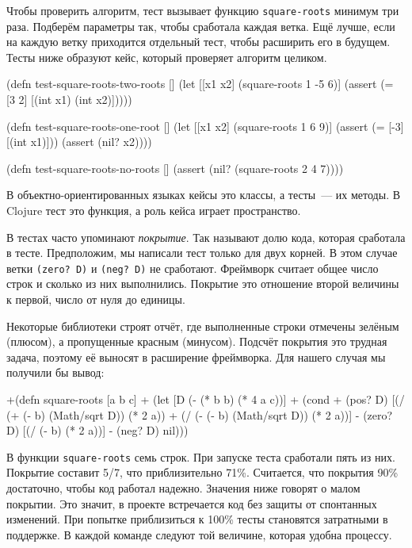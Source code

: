 
Чтобы проверить алгоритм, тест вызывает функцию \verb|square-roots| минимум три
раза. Подберём параметры так, чтобы сработала каждая ветка. Ещё лучше, если на
каждую ветку приходится отдельный тест, чтобы расширить его в будущем. Тесты ниже
образуют кейс, который проверяет алгоритм целиком.

\begin{english}
  \begin{clojure}
(defn test-square-roots-two-roots []
  (let [[x1 x2] (square-roots 1 -5 6)]
    (assert (= [3 2] [(int x1) (int x2)]))))

(defn test-square-roots-one-root []
  (let [[x1 x2] (square-roots 1 6 9)]
    (assert (= [-3] [(int x1)]))
    (assert (nil? x2))))

(defn test-square-roots-no-roots []
  (assert (nil? (square-roots 2 4 7))))
  \end{clojure}
\end{english}

В объектно-ориентированных языках кейсы это классы, а тесты~--- их методы. В
Clojure тест это функция, а роль кейса играет пространство.


В тестах часто упоминают \emph{покрытие}. Так называют долю кода, которая
сработала в тесте. Предположим, мы написали тест только для двух корней. В этом
случае ветки \verb|(zero? D)| и \verb|(neg? D)| не сработают. Фреймворк считает
общее число строк и сколько из них выполнились. Покрытие это отношение второй
величины к первой, число от нуля до единицы.

Некоторые библиотеки строят отчёт, где выполненные строки отмечены зелёным
(плюсом), а пропущенные красным (минусом). Подсчёт покрытия это трудная задача,
поэтому её выносят в расширение фреймворка. Для нашего случая мы получили бы
вывод:

\begin{english}
  \begin{diff}
+(defn square-roots [a b c]
+  (let [D (- (* b b) (* 4 a c))]
+    (cond
+      (pos? D) [(/ (+ (- b) (Math/sqrt D)) (* 2 a))
+                (/ (- (- b) (Math/sqrt D)) (* 2 a))]
-      (zero? D) [(/ (- b) (* 2 a))]
-      (neg? D) nil)))
  \end{diff}
\end{english}

В функции \verb|square-roots| семь строк. При запуске теста сработали пять из
них. Покрытие составит 5/7, что приблизительно 71\%. Считается, что покрытия
90\% достаточно, чтобы код работал надежно. Значения ниже говорят о малом
покрытии. Это значит, в проекте встречается код без защиты от спонтанных
изменений. При попытке приблизиться к 100\% тесты становятся затратными в
поддержке. В каждой команде следуют той величине, которая удобна процессу.


